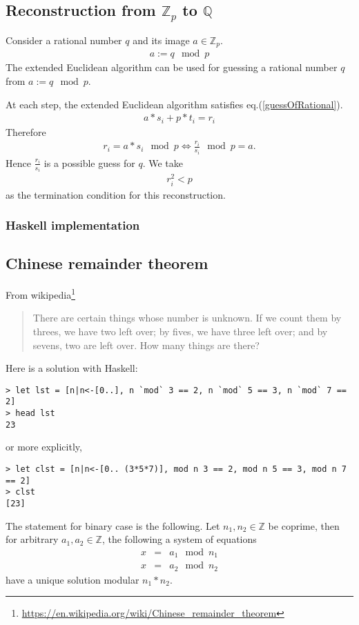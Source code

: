 \documentclass[11pt]{book}
\begin{document}
\subsection{Reconstruction from $\mathbb{Z}_p$ to $\mathbb{Q}$}
Consider a rational number $q$ and its image $a \in \mathbb{Z}_p$.
\begin{eqnarray}
a := q \mod p
\end{eqnarray}
The extended Euclidean algorithm can be used for guessing a rational number $q$ from $a := q \mod p$.

At each step, the extended Euclidean algorithm satisfies eq.(\ref{guessOfRational}).
\begin{eqnarray}
a*s_i + p*t_i = r_i
\end{eqnarray}
Therefore
\begin{eqnarray}
r_i = a*s_i \mod p \Leftrightarrow \frac{r_i}{s_i} \mod p = a.
\end{eqnarray}
Hence $\frac{r_i}{s_i}$ is a possible guess for $q$.
We take
\begin{eqnarray}
r_i^2 < p
\end{eqnarray}
as the termination condition for this reconstruction.

\subsubsection{Haskell implementation}


\subsection{Chinese remainder theorem}
From wikipedia\footnote{
\url{https://en.wikipedia.org/wiki/Chinese_remainder_theorem}
}
\begin{quotation}
There are certain things whose number is unknown. If we count them by threes, we have two left over; by fives, we have three left over; and by sevens, two are left over. How many things are there? 
\end{quotation}
Here is a solution with Haskell:
\begin{verbatim}
> let lst = [n|n<-[0..], n `mod` 3 == 2, n `mod` 5 == 3, n `mod` 7 == 2]
> head lst
23
\end{verbatim}
or more explicitly,
\begin{verbatim}
> let clst = [n|n<-[0.. (3*5*7)], mod n 3 == 2, mod n 5 == 3, mod n 7 == 2]
> clst 
[23]
\end{verbatim}

The statement for binary case is the following.
Let $n_1, n_2 \in \mathbb{Z}$ be coprime, then for arbitrary $a_1,a_2 \in \mathbb{Z}$, the following a system of equations
\begin{eqnarray}
x &=& a_1 \mod n_1\\
x &=& a_2 \mod n_2
\end{eqnarray}
have a unique solution modular $n_1*n_2$.
\end{document}

